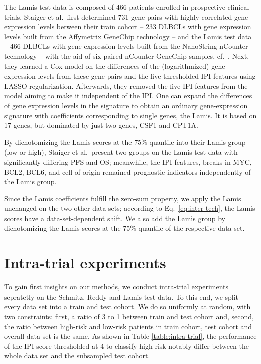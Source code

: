 The Lamis test data is composed of \num{466} patients enrolled in prospective clinical trials. 
Staiger et al.\ first determined \num{731} gene pairs with highly correlated gene expression levels 
between their train cohort -- \num{233} DLBCLs with gene expression levels built from the Affymetrix 
GeneChip technology -- and the Lamis test data -- \num{466} DLBCLs with gene expression levels built 
from the NanoString nCounter technology -- with the aid of six paired nCounter-GeneChip samples, cf.\ 
\cite[Supplementary Methods]{staiger20}.
Next, they learned a Cox model on the differences of the (logarithmized) gene expression levels 
from these gene pairs and the five thresholded IPI features using LASSO regularization. 
Afterwards, they removed the five IPI features from the model aiming to make it independent of the 
IPI. One can expand the differences of gene expression levels in the signature to obtain an ordinary 
gene-expression signature with coefficients corresponding to single genes, the Lamis. It is 
based on \num{17} genes, but dominated by just two genes, CSF1 and CPT1A. 

By dichotomizing the 
Lamis scores at the 75\%-quantile into their Lamis group (low or high), Staiger et al.\ present two 
groups on the Lamis test data with significantly differing PFS and OS; 
meanwhile, the IPI features, breaks in MYC, BCL2, BCL6, and cell of origin remained prognostic 
indicators independently of the Lamis group.

Since the Lamis coefficients fulfill the 
zero-sum property, we apply the Lamis unchanged on the two other data sets; according to Eq.\ 
\eqref{eq:inter-tech}, the Lamis scores have a data-set-dependent shift. We also add the Lamis 
group by dichotomizing the Lamis scores at the 75\%-quantile of the respective data set.

\section{Intra-trial experiments}

To gain first insights on our methods, we conduct intra-trial experiments sepratetly on the 
Schmitz, Reddy and Lamis test data. To this end, we split every data set into a train and test 
cohort. We do so uniformly at random, with two constraints: first, a ratio of 3 to 1 between train 
and test cohort and, second, the ratio between high-risk and low-risk patients in train cohort, 
test cohort and overall data set is the same. As shown in Table \ref{table:intra-trial}, the 
performance of the IPI score thresholded at 4 to classify high risk notably differ between the whole
data set and the subsampled test cohort. 


